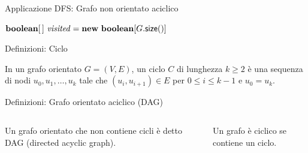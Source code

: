 \begin{frame}[shrink=10]{Applicazione DFS: Grafo non orientato aciclico}

\large
\begin{Procedure}
\caption[A]{$\BOOLEAN\ \textsf{hasCycle}(\Graph\ G)$}
$\BOOLEAN[\,]\ \mmark = \NEW\ \BOOLEAN[G.\textsf{size}()]$\;
\Return \FALSE\;
\end{Procedure}

\end{frame}


\begin{frame}{Definizioni: Ciclo}
	
\vspace{-9pt}
\begin{myboxtitle}
In un grafo orientato $G=(V,E)$, un \alert{ciclo} $C$ di lunghezza $k \geq 2$ è una sequenza di nodi $u_0, u_1, \ldots, u_k$ tale che $(u_i, u_{i+1}) \in E$ per $0 \leq i \leq k-1$ e $u_0 = u_k$.
\end{myboxtitle}


\end{frame}

\begin{frame}{Definizioni: Grafo orientato aciclico (DAG)}

\vspace{-9pt}
\begin{columns}[T]
\begin{myboxtitle}[DAG]
Un grafo orientato che non contiene cicli è detto \alert{DAG} (\alert{directed acyclic graph}).
\end{myboxtitle}

\bigskip
\begin{myboxtitle}
Un grafo è \alert{ciclico} se contiene un ciclo.
\end{myboxtitle}
    
\vspace{-12pt}

\end{columns}
\end{frame}

